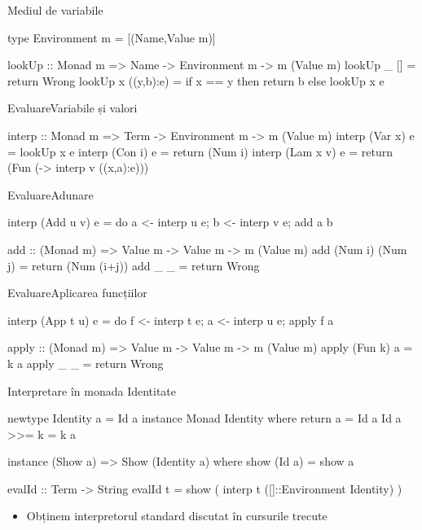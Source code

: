 \documentclass[xcolor=pdftex,romanian,colorlinks]{beamer}
\begin{document}
\begin{frame}[fragile]
{Mediul de variabile}
\begin{asciihs}
type Environment m = [(Name,Value m)]

lookUp :: Monad m => Name -> Environment m -> m (Value m)
lookUp _ [] 
  = return Wrong
lookUp x ((y,b):e)
  = if x == y then return b else lookUp x e
\end{asciihs}
\end{frame}

\begin{frame}[fragile]
{Evaluare}{Variabile și valori}
\begin{asciihs}
interp :: Monad m => Term -> Environment m -> m (Value m)
interp (Var x) e   = lookUp x e
interp (Con i) e   = return (Num i)
interp (Lam x v) e = return (Fun (\a -> interp v ((x,a):e)))
\end{asciihs}
\end{frame}



\begin{frame}[fragile]
{Evaluare}{Adunare}
\begin{asciihs}
interp (Add u v) e = 
  do {
    a <- interp u e;
    b <- interp v e;
    add a b
  }

add :: (Monad m) => Value m -> Value m -> m (Value m)
add (Num i) (Num j) = return (Num (i+j))
add _       _       = return Wrong
\end{asciihs}
\end{frame}

\begin{frame}[fragile]
{Evaluare}{Aplicarea funcțiilor}
\begin{asciihs}
interp (App t u) e = 
  do {
    f <- interp t e;
    a <- interp u e;
    apply f a
  }


apply :: (Monad m) => Value m -> Value m -> m (Value m)
apply (Fun k) a = k a
apply _ _ = return Wrong
\end{asciihs}
\end{frame}


\begin{frame}[fragile]{Interpretare în monada Identitate}
\begin{asciihs}
newtype Identity a = Id a
instance Monad Identity where
  return a   = Id a
  Id a >>= k = k a

instance (Show a) => Show (Identity a) where
  show (Id a) = show a

evalId :: Term -> String
evalId t = show ( interp t ([]::Environment Identity) )
\end{asciihs}
\begin{itemize}
\item Obținem interpretorul standard discutat în cursurile trecute
\end{itemize}
\end{frame}
\end{document}
